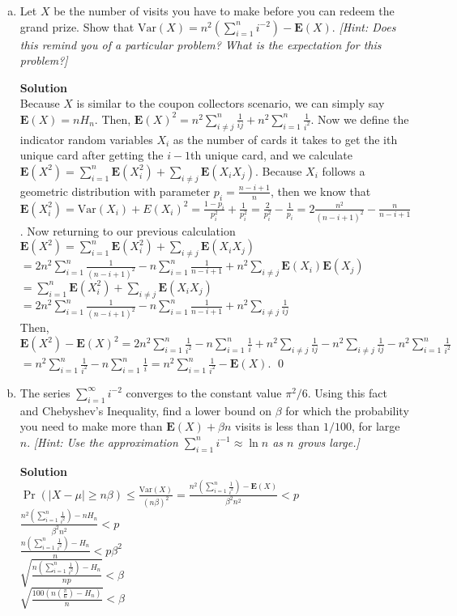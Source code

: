 \documentclass[11pt]{article}
\newenvironment{Answer}{\vspace{10pt}\begin{mdframed}\textbf{Solution}\\}{\end{mdframed}\vfill\pagebreak[3]}
\newenvironment{Answer}{\vspace{10pt}}{\vfill\pagebreak[3]}
\newcommand*{\E}{\textbf{E}}
\newcommand*{\Var}[1]{\text{Var}(#1)}
\begin{document}
\begin{enumerate}[(a)]
    \item Let $X$ be the number of visits you have to make before you can redeem the grand prize. Show that $\Var{X} = n^2\left(\sum_{i=1}^n i^{-2}\right) - \E(X)$. \textit{[Hint: Does this remind you of a particular problem? What is the expectation for this problem?]}
    \begin{Answer}
Because $X$ is similar to the coupon collectors scenario, we can simply say $\E(X)=nH_n$. Then, $\E(X)^2=n^2\sum_{i \neq j}^n\frac{1}{ij}+n^2\sum_{i=1}^n\frac{1}{i^2}$. Now we define the indicator random variables $X_i$ as the number of cards it takes to get the ith unique card after getting the $i-1$th unique card, and we calculate $\E(X^2)=\sum_{i=1}^n\E(X_i^2)+\sum_{i \neq j}\E(X_iX_j)$. Because $X_i$ follows a geometric distribution with parameter $p_i=\frac{n-i+1}{n}$, then we know that $\E(X_i^2)=\Var{X_i}+E(X_i)^2=\frac{1-p_i}{p_i^2}+\frac{1}{p_i^2}=\frac{2}{p_i^2}-\frac{1}{p_i}=2\frac{n^2}{(n-i+1)^2}-\frac{n}{n-i+1}$. Now returning to our previous calculation \\ $\E(X^2)=\sum_{i=1}^n\E(X_i^2)+\sum_{i \neq j}\E(X_iX_j)$\\
$=2n^2\sum_{i=1}^n\frac{1}{(n-i+1)^2}-n\sum_{i=1}^n\frac{1}{n-i+1}+n^2\sum_{i \neq j}\E(X_i)\E(X_j)$\\
$=\sum_{i=1}^n\E(X_i^2)+\sum_{i \neq j}\E(X_iX_j)$\\
$=2n^2\sum_{i=1}^n\frac{1}{(n-i+1)^2}-n\sum_{i=1}^n\frac{1}{n-i+1}+n^2\sum_{i \neq j}\frac{1}{ij}$\\
Then, $\E(X^2)-\E(X)^2=2n^2\sum_{i=1}^n\frac{1}{i^2}-n\sum_{i=1}^n\frac{1}{i}+n^2\sum_{i \neq j}\frac{1}{ij}-n^2\sum_{i \neq j}\frac{1}{ij}-n^2\sum_{i=1}^n\frac{1}{i^2}$\\
$=n^2\sum_{i=1}^n\frac{1}{i^2}-n\sum_{i=1}^n\frac{1}{i}=n^2\sum_{i=1}^n\frac{1}{i^2}-\E(X)$. \qed
    \end{Answer}
  
    \item The series $\sum_{i=1}^\infty i^{-2}$ converges to the constant value $\pi^2/6$. Using this fact and Chebyshev's Inequality, find a lower bound on $\beta$ for which the probability you need to make more than $\E(X) + \beta n$ visits is less than $1/100$, for large $n$. \textit{[Hint: Use the approximation $\sum_{i = 1}^n i^{-1} \approx \ln n$ as $n$ grows large.]}
    \begin{Answer}
$\Pr(|X-\mu| \geq n\beta) \leq \frac{\Var{X}}{(n\beta)^2}=\frac{n^2(\sum_{i=1}^n\frac{1}{i^2})-\E(X)}{\beta^2n^2}<p$ \\
$\frac{n^2(\sum_{i=1}^n\frac{1}{i^2})-nH_n}{\beta^2n^2}<p$\\
$\frac{n(\sum_{i=1}^n\frac{1}{i^2})-H_n}{n}<p\beta^2$\\
$\sqrt{\frac{n(\sum_{i=1}^n\frac{1}{i^2})-H_n}{np}}<\beta$\\
$\sqrt{\frac{100(n(\frac{\pi}{6})-H_n)}{n}}<\beta$\\
    \end{Answer}
\end{enumerate}
\end{document}
